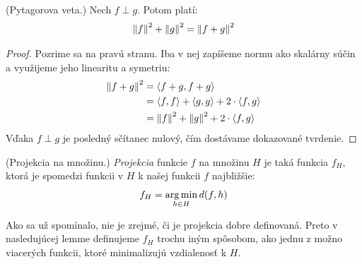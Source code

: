 \begin{lemma}
  (Pytagorova veta.) Nech $f \perp g$. Potom platí:
  $$\left\lVert f\right\rVert^2 + \left\lVert g\right\rVert^2 = \left\lVert f + g\right\rVert^2$$
\end{lemma}
\begin{proof}
  Pozrime sa na pravú stranu. Iba v nej zapíšeme normu ako skalárny
  súčin a využijeme jeho linearitu a symetriu:
  \begin{align}
    \left\lVert f + g\right\rVert^2
      &= \langle f + g, f + g \rangle \\
      &= \langle f, f \rangle + \langle g, g \rangle + 2 \cdot \langle f, g \rangle \\
      &= \left\lVert f\right\rVert^2 + \left\lVert g\right\rVert^2 + 2 \cdot \langle f, g \rangle
  \end{align}
  Vďaka $f \perp g$ je posledný sčítanec nulový, čím dostávame
  dokazované tvrdenie.
\end{proof}

\begin{definition}
  (Projekcia na množinu.) \emph{Projekcia} funkcie $f$ na množinu $H$
  je taká funkcia $f_H$, ktorá je spomedzi funkcii v $H$ k našej
  funkcii $f$ najbližšie:
  $$f_H = \operatorname*{arg\,min}_{h \in H} d(f, h)$$
\end{definition}
\begin{remark}
  Ako sa už spomínalo, nie je zrejmé, či je projekcia dobre definovaná.
  Preto v nasledujúcej lemme definujeme $f_H$ trochu iným spôsobom, ako
  jednu z možno viacerých funkcii, ktoré minimalizujú vzdialenosť k $H$.
\end{remark}

